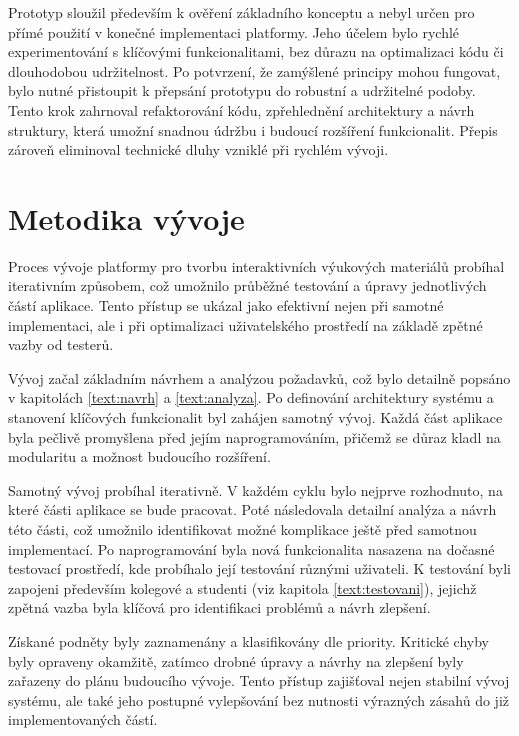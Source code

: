 Prototyp sloužil především k ověření základního konceptu a nebyl určen pro přímé použití v konečné implementaci platformy. 
Jeho účelem bylo rychlé experimentování s klíčovými funkcionalitami, bez důrazu na optimalizaci kódu či dlouhodobou udržitelnost. 
Po potvrzení, že zamýšlené principy mohou fungovat, bylo nutné přistoupit k přepsání prototypu do robustní a udržitelné podoby. 
Tento krok zahrnoval refaktorování kódu, zpřehlednění architektury a návrh struktury, která umožní snadnou údržbu i budoucí rozšíření funkcionalit. 
Přepis zároveň eliminoval technické dluhy vzniklé při rychlém vývoji.


\section{Metodika vývoje}

Proces vývoje platformy pro tvorbu interaktivních výukových materiálů probíhal iterativním způsobem, což umožnilo průběžné testování a úpravy jednotlivých částí aplikace. 
Tento přístup se ukázal jako efektivní nejen při samotné implementaci, ale i při optimalizaci uživatelského prostředí na základě zpětné vazby od testerů.

Vývoj začal základním návrhem a analýzou požadavků, což bylo detailně popsáno v kapitolách \ref{text:navrh} a \ref{text:analyza}. 
Po definování architektury systému a stanovení klíčových funkcionalit byl zahájen samotný vývoj. 
Každá část aplikace byla pečlivě promyšlena před jejím naprogramováním, přičemž se důraz kladl na modularitu a možnost budoucího rozšíření.

Samotný vývoj probíhal iterativně. 
V každém cyklu bylo nejprve rozhodnuto, na které části aplikace se bude pracovat. 
Poté následovala detailní analýza a návrh této části, což umožnilo identifikovat možné komplikace ještě před samotnou implementací. 
Po naprogramování byla nová funkcionalita nasazena na dočasné testovací prostředí, kde probíhalo její testování různými uživateli. 
K testování byli zapojeni především kolegové a studenti (viz kapitola \ref{text:testovani}), jejichž zpětná vazba byla klíčová pro identifikaci problémů a návrh zlepšení.

Získané podněty byly zaznamenány a klasifikovány dle priority. 
Kritické chyby byly opraveny okamžitě, zatímco drobné úpravy a návrhy na zlepšení byly zařazeny do plánu budoucího vývoje. 
Tento přístup zajišťoval nejen stabilní vývoj systému, ale také jeho postupné vylepšování bez nutnosti výrazných zásahů do již implementovaných částí.

